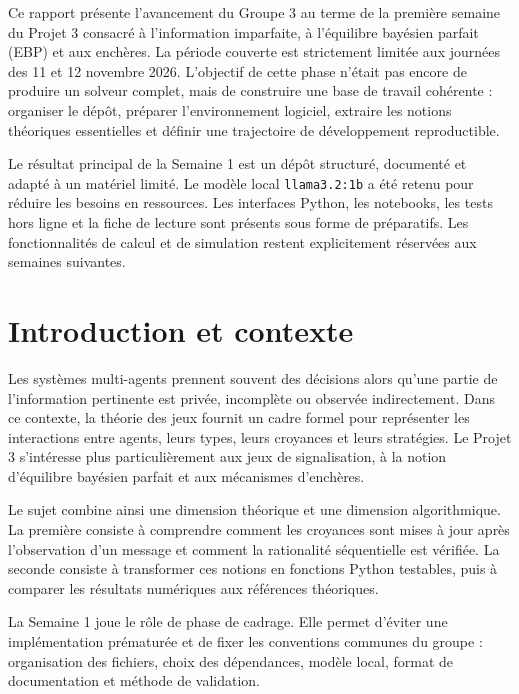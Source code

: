 \documentclass[11pt,a4paper]{article}
\begin{document}
Ce rapport présente l'avancement du Groupe 3 au terme de la première semaine
du Projet 3 consacré à l'information imparfaite, à l'équilibre bayésien parfait
(EBP) et aux enchères. La période couverte est strictement limitée aux
journées des 11 et 12 novembre 2026. L'objectif de cette phase n'était pas
encore de produire un solveur complet, mais de construire une base de travail
cohérente : organiser le dépôt, préparer l'environnement logiciel, extraire
les notions théoriques essentielles et définir une trajectoire de développement
reproductible.

Le résultat principal de la Semaine 1 est un dépôt structuré, documenté et
adapté à un matériel limité. Le modèle local \texttt{llama3.2:1b} a été retenu
pour réduire les besoins en ressources. Les interfaces Python, les notebooks,
les tests hors ligne et la fiche de lecture sont présents sous forme de
préparatifs. Les fonctionnalités de calcul et de simulation restent
explicitement réservées aux semaines suivantes.

\clearpage
\tableofcontents
\clearpage
{}

\section{Introduction et contexte}

Les systèmes multi-agents prennent souvent des décisions alors qu'une partie
de l'information pertinente est privée, incomplète ou observée indirectement.
Dans ce contexte, la théorie des jeux fournit un cadre formel pour représenter
les interactions entre agents, leurs types, leurs croyances et leurs
stratégies. Le Projet 3 s'intéresse plus particulièrement aux jeux de
signalisation, à la notion d'équilibre bayésien parfait et aux mécanismes
d'enchères.

Le sujet combine ainsi une dimension théorique et une dimension
algorithmique. La première consiste à comprendre comment les croyances sont
mises à jour après l'observation d'un message et comment la rationalité
séquentielle est vérifiée. La seconde consiste à transformer ces notions en
fonctions Python testables, puis à comparer les résultats numériques aux
références théoriques.

La Semaine 1 joue le rôle de phase de cadrage. Elle permet d'éviter une
implémentation prématurée et de fixer les conventions communes du groupe :
organisation des fichiers, choix des dépendances, modèle local, format de
documentation et méthode de validation.
\end{document}
